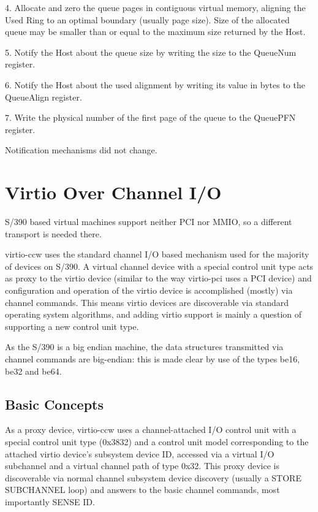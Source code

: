 4. Allocate and zero the queue pages in contiguous virtual
   memory, aligning the Used Ring to an optimal boundary (usually
   page size). Size of the allocated queue may be smaller than or
   equal to the maximum size returned by the Host.

5. Notify the Host about the queue size by writing the size to
   the QueueNum register.

6. Notify the Host about the used alignment by writing its value
   in bytes to the QueueAlign register.

7. Write the physical number of the first page of the queue to
   the QueuePFN register.

Notification mechanisms did not change.

\section{Virtio Over Channel I/O}\label{sec:Virtio Transport Options / Virtio Over Channel I/O}

S/390 based virtual machines support neither PCI nor MMIO, so a
different transport is needed there.

virtio-ccw uses the standard channel I/O based mechanism used for
the majority of devices on S/390. A virtual channel device with a
special control unit type acts as proxy to the virtio device
(similar to the way virtio-pci uses a PCI device) and
configuration and operation of the virtio device is accomplished
(mostly) via channel commands. This means virtio devices are
discoverable via standard operating system algorithms, and adding
virtio support is mainly a question of supporting a new control
unit type.

As the S/390 is a big endian machine, the data structures transmitted
via channel commands are big-endian: this is made clear by use of
the types be16, be32 and be64.

\subsection{Basic Concepts}\label{sec:Virtio Transport Options / Virtio over channel I/O / Basic Concepts}

As a proxy device, virtio-ccw uses a channel-attached I/O control
unit with a special control unit type (0x3832) and a control unit
model corresponding to the attached virtio device's subsystem
device ID, accessed via a virtual I/O subchannel and a virtual
channel path of type 0x32. This proxy device is discoverable via
normal channel subsystem device discovery (usually a STORE
SUBCHANNEL loop) and answers to the basic channel commands, most
importantly SENSE ID.

